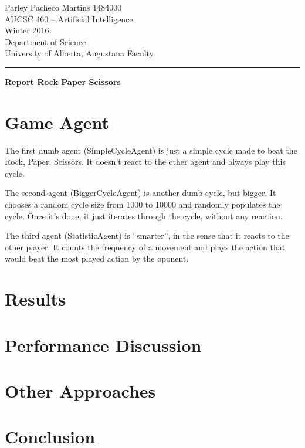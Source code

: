 \documentclass[12pt]{article}
\begin{document}
\noindent
Parley Pacheco Martins 1484000\\
AUCSC 460 -- Artificial Intelligence\\
Winter 2016\\
Department of Science\\
University of Alberta, Augustana Faculty

\vspace*{0.75\baselineskip}
\hrule
\vspace*{0.75\baselineskip}

\noindent
{\Large\bf Report Rock Paper Scissors }

\section{Game Agent}

The first dumb agent (SimpleCycleAgent) is just a simple cycle made to beat the Rock, Paper, Scissors. It doesn't react to the other agent and always play this cycle.

The second agent (BiggerCycleAgent) is another dumb cycle, but bigger. It chooses a random cycle size from 1000 to 10000 and randomly populates the cycle. Once it's done, it just iterates through the cycle, without any reaction.

The third agent (StatisticAgent) is ``smarter'', in the sense that it reacts to the other player. It counts the frequency of a movement and plays the action that would beat the most played action by the oponent.


\section{Results}

\section{Performance Discussion}

\section{Other Approaches}

\section{Conclusion}
\end{document}
